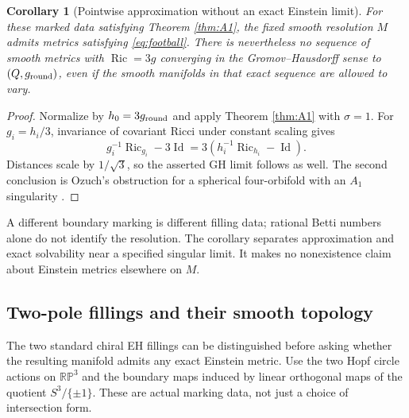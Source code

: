 \documentclass[a4paper,11pt]{article}
\numberwithin{equation}{section}
\newtheorem{corollary}[theorem]{Corollary}
\theoremstyle{definition}
\newcommand{\Ric}{\operatorname{Ric}}
\newcommand{\Id}{\operatorname{Id}}
\begin{document}
\begin{corollary}[Pointwise approximation without an exact Einstein limit]\label{cor:football-separation}
For these marked data satisfying Theorem \ref{thm:A1}, the fixed smooth resolution $M$ admits metrics satisfying \eqref{eq:football}.
There is nevertheless no sequence of smooth metrics with $\Ric=3g$ converging in the Gromov--Hausdorff sense to $(Q,g_{\rm round})$, even if the smooth manifolds in that exact sequence are allowed to vary.
\end{corollary}
\begin{proof}
Normalize by $h_0=3g_{\rm round}$ and apply Theorem \ref{thm:A1} with $\sigma=1$.
For $g_i=h_i/3$, invariance of covariant Ricci under constant scaling gives
\[
g_i^{-1}\Ric_{g_i}-3\Id=3(h_i^{-1}\Ric_{h_i}-\Id).
\]
Distances scale by $1/\sqrt3$, so the asserted GH limit follows as well.
The second conclusion is Ozuch's obstruction for a spherical four-orbifold with an $A_1$ singularity \cite[Theorem 0.9 and Example 0.10]{OzuchIntegrability}.
\end{proof}
A different boundary marking is different filling data; rational Betti numbers alone do not identify the resolution.
The corollary separates approximation and exact solvability near a specified singular limit.
It makes no nonexistence claim about Einstein metrics elsewhere on $M$.

\subsection{Two-pole fillings and their smooth topology}\label{sec:two-pole-fillings}
The two standard chiral EH fillings can be distinguished before asking whether the resulting manifold admits any exact Einstein metric. Use the two Hopf circle actions on $\mathbb{RP}^3$ and the boundary maps induced by linear orthogonal maps of the quotient $S^3/\{\pm1\}$. These are actual marking data, not just a choice of intersection form.
\end{document}

